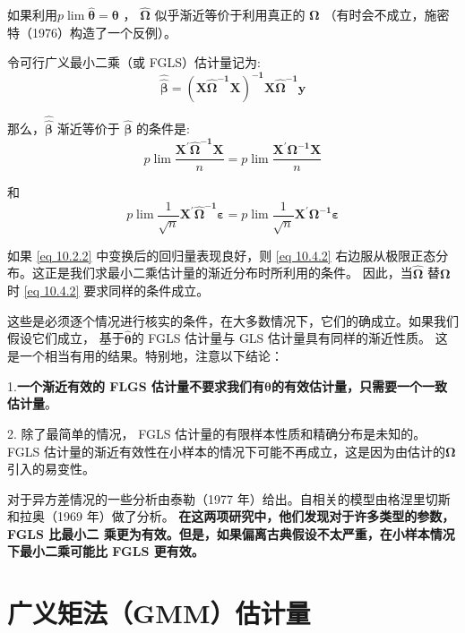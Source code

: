     如果利用$ p \lim \boldsymbol{\hat{\theta}} = \boldsymbol{\theta} $ ，
    $ \boldsymbol{\hat{\Omega }}$ 似乎渐近等价于利用真正的 $ \boldsymbol{\Omega} $ （有时会不成立，施密特（1976）构造了一个反例）。

    令可行广义最小二乘（或 FGLS）估计量记为:
    $$ \boldsymbol{\hat{\hat{\beta}}=\left(X \hat{\Omega}^{-1} X\right)^{-1} X \hat{\Omega}^{-1} y} $$

    那么，$ \boldsymbol{\hat{\hat{\beta}}} $ 渐近等价于 $ \boldsymbol{\hat{\beta}} $ 的条件是:
    \begin{equation}
         p \lim \frac{ \boldsymbol{X^{\prime }\hat{\Omega}^{-1} X}}{n}=p \lim \frac{\boldsymbol{X^{\prime }\Omega^{-1} X}}{n} 
    \end{equation}

    和
   \begin{equation}
      p \lim \frac{1}{\sqrt{n}} \boldsymbol{X^{\prime } \hat{\Omega}^{-1} \varepsilon}
        =p \lim \frac{1}{\sqrt{n}} \boldsymbol{X^{\prime } \Omega^{-1} \varepsilon}
     \label{eq 10.4.2}
   \end{equation}

   如果 \ref{eq 10.2.2} 中变换后的回归量表现良好，则 \ref{eq 10.4.2} 右边服从极限正态分布。这正是我们求最小二乘估计量的渐近分布时所利用的条件。
   因此，当$ \boldsymbol{\hat{\Omega}} $ 替$ \boldsymbol{\Omega} $时 \ref{eq 10.4.2} 要求同样的条件成立。

   这些是必须逐个情况进行核实的条件，在大多数情况下，它们的确成立。如果我们假设它们成立， 
     基于$ \boldsymbol{\hat{\theta}} $的 FGLS 估计量与 GLS 估计量具有同样的渐近性质。 这是一个相当有用的结果。特别地，注意以下结论：

   1.{\bf 一个渐近有效的 FLGS 估计量不要求我们有$ \boldsymbol{\theta} $的有效估计量，只需要一个一致估计量}。
   
   2. 除了最简单的情况， FGLS 估计量的有限样本性质和精确分布是未知的。 
   FGLS 估计量的渐近有效性在小样本的情况下可能不再成立，这是因为由估计的$ \boldsymbol{\Omega} $引入的易变性。

   对于异方差情况的一些分析由泰勒（1977 年）给出。自相关的模型由格涅里切斯和拉奥（1969 年）做了分析。 {\bf 在这两项研究中，他们发现对于许多类型的参数， FGLS 比最小二
    乘更为有效。但是，如果偏离古典假设不太严重，在小样本情况下最小二乘可能比 FGLS 更有效。}

\section{广义矩法（GMM）估计量}

